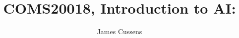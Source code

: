 \usepackage{amsmath, amssymb, graphicx}
\usepackage[]{algorithm2e}
\usepackage{pdfpages}
\usepackage{bm}
\usepackage{relsize}
\usepackage[british]{babel}
\usepackage{tikz,tikzsymbols}
\usepackage{hyperref}
\usepackage{cancel}
\usepackage{caption,subcaption}
\usepackage{adjustbox}
\usepackage{overpic}
\usepackage[UKenglish]{isodate}

\usetikzlibrary{arrows,decorations.markings,decorations.pathreplacing,positioning}

\newcommand{\bs}{\boldsymbol}


\hypersetup{colorlinks,linkcolor=,urlcolor=blue}
\newenvironment{titledslide}[1]{\begin{frame}\frametitle{#1}}{\end{frame}}



\author{James Cussens}

\title{COMS20018, Introduction to AI:\\ \vspace{5pt} \lecttitle}


